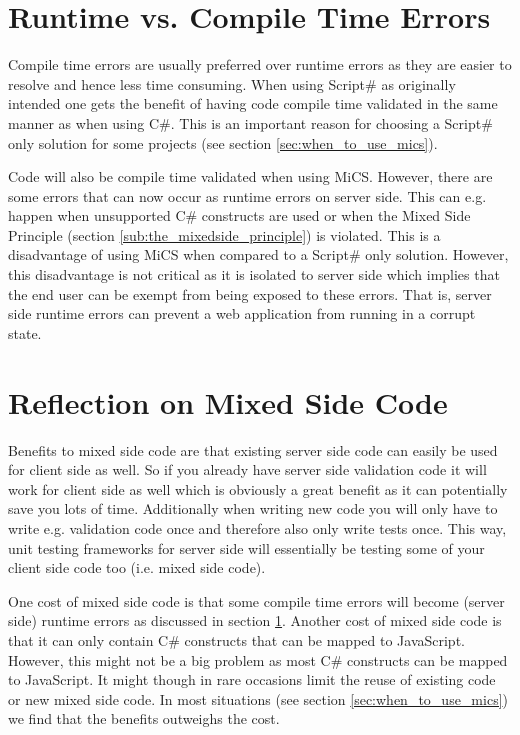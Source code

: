 \section{Runtime vs. Compile Time Errors} %
\label{sec:runtime_vs_compile_time_errors}
	Compile time errors are usually preferred over runtime errors as they are easier to resolve and hence less time consuming. When using Script\# as originally intended one gets the benefit of having code compile time validated in the same manner as when using C\#. This is an important reason for choosing a Script\# only solution for some projects (see section \ref{sec:when_to_use_mics}).

	Code will also be compile time validated when using MiCS. However, there are some errors that can now occur as runtime errors on server side. This can e.g. happen when unsupported C\# constructs are used or when the Mixed Side Principle (section \ref{sub:the_mixedside_principle}) is violated. This is a disadvantage of using MiCS when compared to a Script\# only solution. However, this disadvantage is not critical as it is isolated to server side which implies that the end user can be exempt from being exposed to these errors. That is, server side runtime errors can prevent a web application from running in a corrupt state. 


\section{Reflection on Mixed Side Code} %
\label{sec:reflection_on_mixed_side_code}
	Benefits to mixed side code are that existing server side code can easily be used for client side as well. So if you already have server side validation code it will work for client side as well which is obviously a great benefit as it can potentially save you lots of time. Additionally when writing new code you will only have to write e.g. validation code once and therefore also only write tests once. This way, unit testing frameworks for server side will essentially be testing some of your client side code too (i.e. mixed side code).

	One cost of mixed side code is that some compile time errors will become (server side) runtime errors as discussed in section \ref{sec:runtime_vs_compile_time_errors}. Another cost of mixed side code is that it can only contain C\# constructs that can be mapped to JavaScript. However, this might not be a big problem as most C\# constructs can be mapped to JavaScript. It might though in rare occasions limit the reuse of existing code or new mixed side code. In most situations (see section \ref{sec:when_to_use_mics}) we find that the benefits outweighs the cost.

